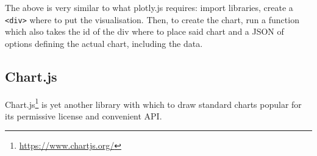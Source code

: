 \documentclass[
  10pt,
]{krantz}
\renewcommand{\href}[2]{#2\footnote{\url{#1}}}
\begin{document}
The above is very similar to what plotly.js requires: import libraries, create a \texttt{\textless{}div\textgreater{}} where to put the visualisation. Then, to create the chart, run a function which also takes the id of the div where to place said chart and a JSON of options defining the actual chart, including the data.

\hypertarget{widgets-basics-candidates-chart.js}{%
\subsection{Chart.js}\label{widgets-basics-candidates-chart.js}}

\href{https://www.chartjs.org/}{Chart.js} is yet another library with which to draw standard charts popular for its permissive license and convenient API.
\end{document}
